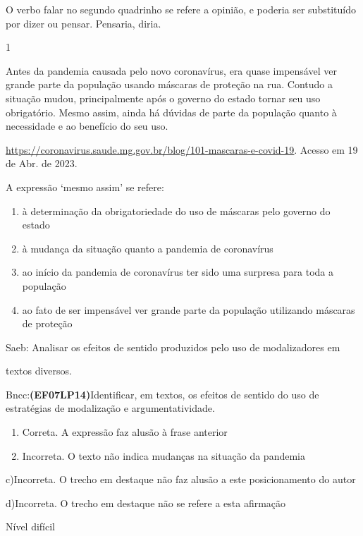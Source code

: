 {O verbo falar no segundo quadrinho se refere a opinião, e poderia ser
substituído por dizer ou pensar. Pensaria, diria.


\num{1}

Antes da pandemia causada pelo novo coronavírus, era quase impensável
ver grande parte da população usando máscaras de proteção na rua.
Contudo a situação mudou, principalmente após o governo do estado tornar
seu uso obrigatório. Mesmo assim, ainda há dúvidas de parte da população
quanto à necessidade e ao benefício do seu uso.

\href{https://coronavirus.saude.mg.gov.br/blog/101-mascaras-e-covid-19}{\uline{https://coronavirus.saude.mg.gov.br/blog/101-mascaras-e-covid-19}}.
Acesso em 19 de Abr. de 2023.

A expressão `mesmo assim' se refere:

\begin{enumerate}
\def\labelenumi{\alph{enumi})}
\item
  à determinação da obrigatoriedade do uso de máscaras pelo governo do
  estado
\item
  à mudança da situação quanto a pandemia de coronavírus
\item
  ao início da pandemia de coronavírus ter sido uma surpresa para toda a
  população
\item
  ao fato de ser impensável ver grande parte da população utilizando
  máscaras de proteção
\end{enumerate}

Saeb: Analisar os efeitos de sentido produzidos pelo uso de
modalizadores em

textos diversos.

Bncc:\textbf{(EF07LP14)}Identificar, em textos, os efeitos de sentido do
uso de estratégias de modalização e argumentatividade.

\begin{enumerate}
\def\labelenumi{\arabic{enumi}.}
\item
  Correta. A expressão faz alusão à frase anterior
\item
  Incorreta. O texto não indica mudanças na situação da pandemia
\end{enumerate}

c)Incorreta. O trecho em destaque não faz alusão a este posicionamento
do autor

d)Incorreta. O trecho em destaque não se refere a esta afirmação

Nível difícil

}
